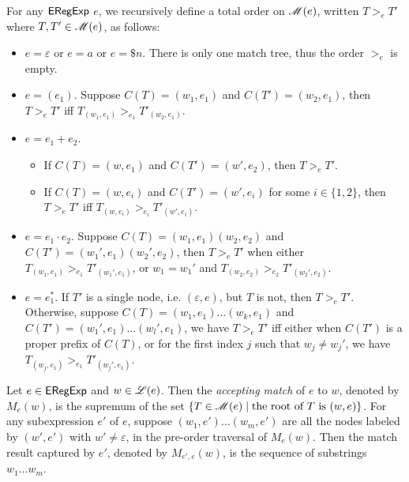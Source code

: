   \begin{definition}\label{def-regex-semantics}
  		
  	For any ${\sf ERegExp}$ $e$, we recursively define a total order on $\mathscr{M}(e)$, written $T
  	>_e T'$ where $T, T' \in \mathscr{M}(e)$, as follows:
  	\begin{itemize}
  		\item $e = \varepsilon$ or $e = a$ or $e = \$ n$. There is only one match tree, thus the
  		order $>_e$ is empty.
  		
  		\item $e = (e_1)$. Suppose $C (T) = (w_1, e_1)$ and $C (T') = (w_2, e_1)$,
  		then $T >_e T'$ iff $T_{(w_1, e_1)} >_{e_1} T'_{(w_2, e_1)}$.
  		
  		\item $e = e_1 + e_2$.
  		\begin{itemize}
  			\item If $C (T) = (w, e_1)$ and $C (T') = (w', e_2)$, then $T >_e T'$.
  			
  			\item If $C (T) = (w, e_i)$ and $C (T') = (w', e_i)$ for some $i \in \{ 1,
  			2 \}$, then $T >_e T'$ iff $T_{(w, e_i)} >_{e_i} T'_{(w', e_i)}$.
  		\end{itemize}
  		\item $e = e_1 \cdot e_2$. Suppose $C (T) = (w_1, e_1) (w_2, e_2)$ and $C (T') =
  		(w_1', e_1) (w_2', e_2)$, then $T >_e T'$ when either $T_{(w_1, e_1)} >_{e_1}
  		T'_{(w_1', e_1)}$, or $w_1 = w_1'$ and $T_{(w_2, e_2)} >_{e_2} T'_{(w_2', e_2)}$.
  		
  		\item $e = e_1^{\ast}$. If $T' $ is  a single node, i.e. $(\varepsilon, e)$, but $T$ is not, then $T >_e T'$.
  		Otherwise, suppose $C(T) = (w_1, e_1) \ldots (w_k, e_1)$ and $C (T') =
  		(w_1', e_1) \ldots (w_l', e_1)$, we have $T >_e T'$ iff either when $C (T')$
  		is a proper prefix of $C (T)$, or for the first index $j$ such that $w_j
  		\neq w_j'$, we have $T_{(w_j, e_1)} >_{e_1} T'_{(w_j', e_1)}$.
  	\end{itemize}
  	
  	Let $e \in {\sf ERegExp}$ and $w \in \mathscr{L}(e)$. Then the \emph{accepting match} of $e$ to $w$, denoted by $M_e(w)$, is the supremum of the set $\{ T \in \mathscr{M}(e) \mid \mbox{the root of } T \mbox{ is } (w, e) \}$.
%  	
  	For any subexpression $e'$ of $e$, suppose $(w_1, e') \ldots (w_m, e')$ are
  	all the nodes labeled by $(w', e')$ with $w' \neq \varepsilon$, in the
  	pre-order traversal of $M_e(w)$. Then the match result captured by $e'$, denoted
  	by $M_{e', e} (w)$, is the sequence of substrings $w_1 \ldots w_m$.
  \end{definition}

